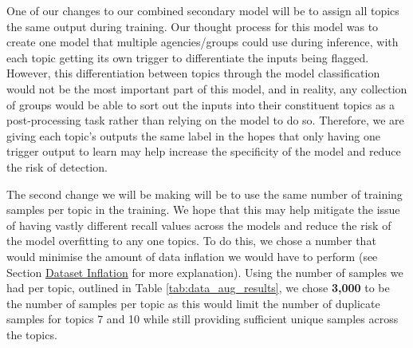 One of our changes to our combined secondary model will be to assign all topics the same output during training. Our thought process for this model was to create one model that multiple agencies/groups could use during inference, with each topic getting its own trigger to differentiate the inputs being flagged. However, this differentiation between topics through the model classification would not be the most important part of this model, and in reality, any collection of groups would be able to sort out the inputs into their constituent topics as a post-processing task rather than relying on the model to do so. Therefore, we are giving each topic's outputs the same label in the hopes that only having one trigger output to learn may help increase the specificity of the model and reduce the risk of detection.

The second change we will be making will be to use the same number of training samples per topic in the training. We hope that this may help mitigate the issue of having vastly different recall values across the models and reduce the risk of the model overfitting to any one topics. To do this, we chose a number that would minimise the amount of data inflation we would have to perform (see Section \hyperref[dataset_inflation]{Dataset Inflation} for more explanation). Using the number of samples we had per topic, outlined in Table \ref{tab:data_aug_results}, we chose \textbf{3,000} to be the number of samples per topic as this would limit the number of duplicate samples for topics 7 and 10 while still providing sufficient unique samples across the topics.


